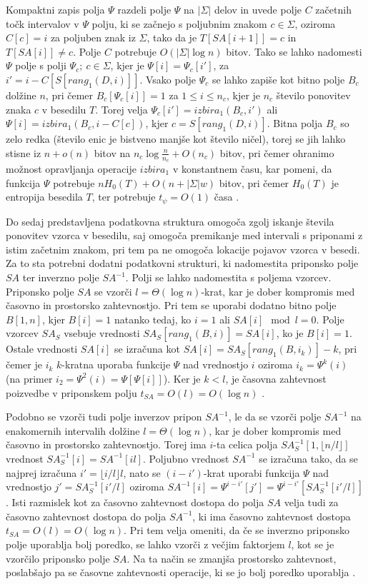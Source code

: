 Kompaktni zapis polja $\Psi$ razdeli polje $\Psi$ na $|\Sigma|$ delov in uvede polje $C$ začetnih točk intervalov v $\Psi$ polju, ki se začnejo s poljubnim znakom $c\in\Sigma$, oziroma $C[c]=i$ za poljuben znak iz $\Sigma$, tako da je $T[SA[i+1]]=c$ in $T[SA[i]]\ne c$. Polje $C$ potrebuje $O(|\Sigma|\log{n})$ bitov. Tako se lahko nadomesti $\Psi$ polje s polji $\Psi_c;\:c\in\Sigma$, kjer je $\Psi[i]=\Psi_c[i']$, za $i'=i-C[S[rang_1(D,i)]]$. Vsako polje $\Psi_c$ se lahko zapiše kot bitno polje $B_c$ dolžine $n$, pri čemer $B_c[\Psi_c[i]]=1$ za $1 \le i \le n_c$, kjer je $n_c$ število ponovitev znaka $c$ v besedilu $T$. Torej velja $\Psi_c[i']=izbira_1(B_c,i')$ ali $\Psi[i]=izbira_1(B_c,i-C[c])$, kjer $c=S[rang_1(D,i)]$. Bitna polja $B_c$ so zelo redka (število enic je bistveno manjše kot število ničel), torej se jih lahko stisne iz $n+o(n)$ bitov na $n_c\log\frac{n}{n_c}+O(n_c)$ bitov, pri čemer ohranimo možnost opravljanja operacije $\textit{izbira}_1$ v konstantnem času, kar pomeni, da funkcija $\Psi$ potrebuje $nH_0(T)+O(n+|\Sigma|w)$ bitov, pri čemer $H_0(T)$ je entropija besedila $T$, ter potrebuje $t_\psi=O(1)$ časa \cite{Navarro2016}.

Do sedaj predstavljena podatkovna struktura omogoča zgolj iskanje števila ponovitev vzorca v besedilu, saj omogoča premikanje med intervali s priponami z istim začetnim znakom, pri tem pa ne omogoča lokacije pojavov vzorca v besedi. Za to sta potrebni dodatni podatkovni strukturi, ki nadomestita priponsko polje $SA$ ter inverzno polje $SA^{-1}$. Polji se lahko nadomestita s poljema vzorcev. Priponsko polje $SA$ se vzorči $l=\Theta(\log{n})$-krat, kar je dober kompromis med časovno in prostorsko zahtevnostjo. Pri tem se uporabi dodatno bitno polje $B[1,n]$, kjer $B[i]=1$ natanko tedaj, ko $i=1$ ali $SA[i]\mod{l} =0$. Polje vzorcev $SA_S$ vsebuje vrednosti $SA_S[rang_1(B,i)]=SA[i]$, ko je $B[i]=1$. Ostale vrednosti $SA[i]$ se izračuna kot $SA[i]=SA_S[rang_1(B,i_k)]-k$, pri čemer je $i_k$ $k$-kratna uporaba funkcije $\Psi$ nad vrednostjo $i$ oziroma $i_k=\Psi^k(i)$ (na primer $i_2=\Psi^2(i)=\Psi[\Psi[i]]$). Ker je $k< l$, je časovna zahtevnost poizvedbe v priponskem polju $t_{SA}=O(l)=O(\log{n})$ \cite{Navarro2016}.

Podobno se vzorči tudi polje inverzov pripon $SA^{-1}$, le da se vzorči polje $SA^{-1}$ na enakomernih intervalih dolžine $l=\Theta(\log{n})$, kar je dober kompromis med časovno in prostorsko zahtevnostjo. Torej ima $i$-ta celica polja $SA^{-1}_S[1,\lfloor n/l\rfloor]$ vrednost $SA^{-1}_S[i]=SA^{-1}[il]$. Poljubno vrednost $SA^{-1}$ se izračuna tako, da se najprej izračuna $i'=\lfloor i/l\rfloor l$, nato se $(i-i')$-krat uporabi funkcija $\Psi$ nad vrednostjo $j'=SA^{-1}_S[i'/l]$ oziroma $SA^{-1}[i]=\Psi^{i-i'}[j']=\Psi^{i-i'}[SA^{-1}_S[i'/l]]$. Isti razmislek kot za časovno zahtevnost dostopa do polja $SA$ velja tudi za časovno zahtevnost dostopa do polja $SA^{-1}$, ki ima časovno zahtevnost dostopa $t_{SA}=O(l)=O(\log{n})$. Pri tem velja omeniti, da če se inverzno priponsko polje uporablja bolj poredko, se lahko vzorči z večjim faktorjem $l$, kot se je vzorčilo priponsko polje $SA$. Na ta način se zmanjša prostorsko zahtevnost, poslabšajo pa se časovne zahtevnosti operacije, ki se jo bolj poredko uporablja \cite{Navarro2016}.


